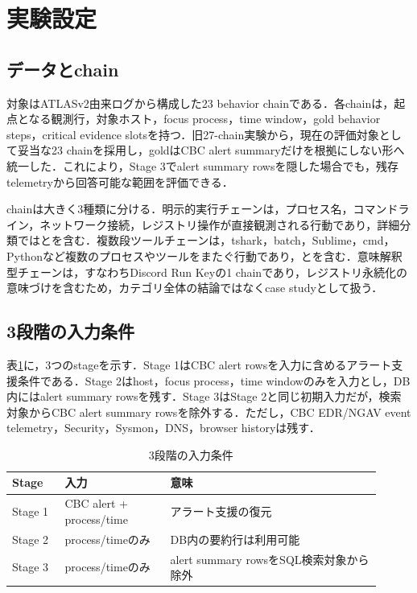 ﻿

\section{実験設定}

\subsection{データとchain}

対象はATLASv2由来ログから構成した23 behavior chainである．各chainは，起点となる観測行，対象ホスト，focus process，time window，gold behavior steps，critical evidence slotsを持つ．旧27-chain実験から，現在の評価対象として妥当な23 chainを採用し，goldはCBC alert summaryだけを根拠にしない形へ統一した．これにより，Stage 3でalert summary rowsを隠した場合でも，残存telemetryから回答可能な範囲を評価できる．

chainは大きく3種類に分ける．明示的実行チェーンは，プロセス名，コマンドライン，ネットワーク接続，レジストリ操作が直接観測される行動であり，詳細分類ではとを含む．複数段ツールチェーンは，tshark，batch，Sublime，cmd，Pythonなど複数のプロセスやツールをまたぐ行動であり，とを含む．意味解釈型チェーンは，すなわちDiscord Run Keyの1 chainであり，レジストリ永続化の意味づけを含むため，カテゴリ全体の結論ではなくcase studyとして扱う．

\subsection{3段階の入力条件}

表\ref{tab:stages}に，3つのstageを示す．Stage 1はCBC alert rowsを入力に含めるアラート支援条件である．Stage 2はhost，focus process，time windowのみを入力とし，DB内にはalert summary rowsを残す．Stage 3はStage 2と同じ初期入力だが，検索対象からCBC alert summary rowsを除外する．ただし，CBC EDR/NGAV event telemetry，Security，Sysmon，DNS，browser historyは残す．

\begin{table}[t]
\centering
\scriptsize
\caption{3段階の入力条件}
\label{tab:stages}
\begin{tabular}{p{0.13\linewidth}p{0.26\linewidth}p{0.52\linewidth}}
\toprule
Stage & 入力 & 意味 \\
\midrule
Stage 1 & CBC alert + process/time & アラート支援の復元 \\
Stage 2 & process/timeのみ & DB内の要約行は利用可能 \\
Stage 3 & process/timeのみ & alert summary rowsをSQL検索対象から除外 \\
\bottomrule
\end{tabular}
\end{table}


